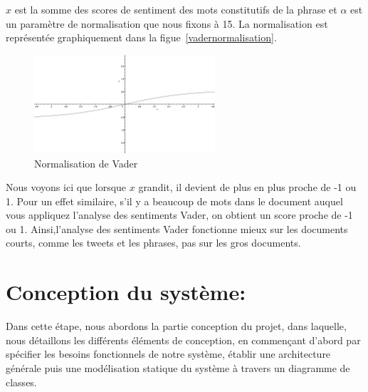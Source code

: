 $x$ est la somme des scores de sentiment des mots constitutifs de la phrase et $\alpha$ est un paramètre de normalisation que nous fixons à 15. La normalisation est représentée graphiquement dans la figue~\ref{vadernormalisation}.
\begin{figure}
    \centering
    \includegraphics[width=0.6\textwidth]{etude-theorique-conception/assets/vader-normalization.png}
    \caption{Normalisation de Vader}
    \label{fig:vadernormalisation}
\end{figure}

Nous voyons ici que lorsque $x$ grandit, il devient de plus en plus proche de -1 ou 1. Pour un effet similaire, s'il y a beaucoup de mots dans le document auquel vous appliquez l'analyse des sentiments Vader, on obtient un score proche de -1 ou 1. Ainsi,l'analyse des sentiments Vader fonctionne mieux sur les documents courts, comme les tweets et les phrases, pas sur les gros documents.

\section{Conception du système:}
Dans cette étape, nous abordons la partie conception du projet, dans laquelle, nous
détaillons les différents éléments de conception, en commençant d'abord par spécifier les besoins fonctionnels de notre système, établir une architecture générale puis une modélisation statique du système à travers un diagramme de classes.

